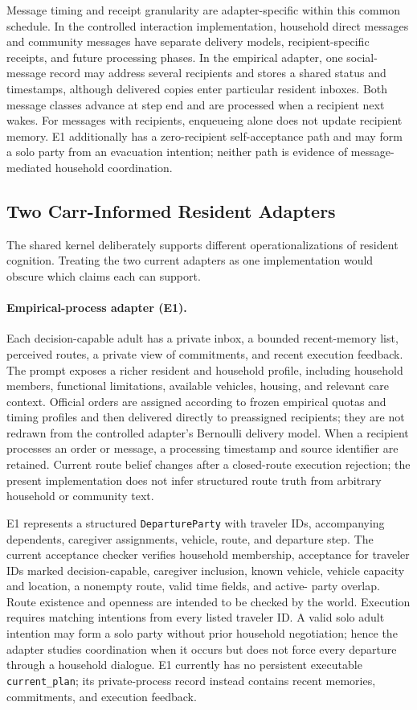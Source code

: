 \documentclass[journal]{IEEEtran}
\begin{document}
Message timing and receipt granularity are adapter-specific within this common
schedule. In the controlled interaction implementation, household direct
messages and community messages have separate delivery models,
recipient-specific receipts, and future processing phases. In the empirical
adapter, one social-message record may address several recipients and stores a
shared status and timestamps, although delivered copies enter particular
resident inboxes. Both message classes advance at step end and are processed
when a recipient next wakes. For messages with recipients, enqueueing alone
does not update recipient memory. E1 additionally has a zero-recipient
self-acceptance path and may form a solo party from an evacuation intention;
neither path is evidence of message-mediated household coordination.

\subsection{Two Carr-Informed Resident Adapters}

The shared kernel deliberately supports different operationalizations of
resident cognition. Treating the two current adapters as one implementation
would obscure which claims each can support.

\paragraph{Empirical-process adapter (E1).}
Each decision-capable adult has a private inbox, a bounded recent-memory list,
perceived routes, a private view of commitments, and recent execution feedback.
The prompt exposes a richer resident and household profile, including household
members, functional limitations, available vehicles, housing, and relevant
care context. Official orders are assigned according to frozen empirical quotas
and timing profiles and then delivered directly to preassigned recipients; they
are not redrawn from the controlled adapter's Bernoulli delivery model. When a
recipient processes an order or message, a processing timestamp and source
identifier are retained. Current route belief changes after a closed-route
execution rejection; the present implementation does not infer structured route
truth from arbitrary household or community text.

E1 represents a structured \texttt{DepartureParty} with traveler IDs,
accompanying dependents, caregiver assignments, vehicle, route, and departure
step. The current acceptance checker verifies household membership, acceptance
for traveler IDs marked decision-capable, caregiver inclusion, known vehicle,
vehicle capacity and location, a nonempty route, valid time fields, and active-
party overlap. Route existence and openness are intended to be checked by the
world. Execution requires matching intentions from every listed traveler ID. A
valid solo adult
intention may form a solo party without prior household negotiation; hence the
adapter studies coordination when it occurs but does not force every departure
through a household dialogue. E1 currently has no persistent executable
\texttt{current\_plan}; its private-process record instead contains recent
memories, commitments, and execution feedback.
\end{document}
